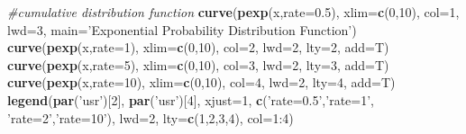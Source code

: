\documentclass[]{article}
\newenvironment{Shaded}{\begin{snugshade}}{\end{snugshade}}
\newcommand{\KeywordTok}[1]{\textcolor[rgb]{0.13,0.29,0.53}{\textbf{{#1}}}}
\newcommand{\DataTypeTok}[1]{\textcolor[rgb]{0.13,0.29,0.53}{{#1}}}
\newcommand{\DecValTok}[1]{\textcolor[rgb]{0.00,0.00,0.81}{{#1}}}
\newcommand{\FloatTok}[1]{\textcolor[rgb]{0.00,0.00,0.81}{{#1}}}
\newcommand{\StringTok}[1]{\textcolor[rgb]{0.31,0.60,0.02}{{#1}}}
\newcommand{\CommentTok}[1]{\textcolor[rgb]{0.56,0.35,0.01}{\textit{{#1}}}}
\newcommand{\NormalTok}[1]{{#1}}
\begin{document}
\begin{Shaded}
\begin{Highlighting}[]
\CommentTok{#cumulative distribution function}
\KeywordTok{curve}\NormalTok{(}\KeywordTok{pexp}\NormalTok{(x,}\DataTypeTok{rate=}\FloatTok{0.5}\NormalTok{), }\DataTypeTok{xlim=}\KeywordTok{c}\NormalTok{(}\DecValTok{0}\NormalTok{,}\DecValTok{10}\NormalTok{), }\DataTypeTok{col=}\DecValTok{1}\NormalTok{, }\DataTypeTok{lwd=}\DecValTok{3}\NormalTok{,}
      \DataTypeTok{main=}\StringTok{'Exponential Probability Distribution Function'}\NormalTok{)}
\KeywordTok{curve}\NormalTok{(}\KeywordTok{pexp}\NormalTok{(x,}\DataTypeTok{rate=}\DecValTok{1}\NormalTok{), }\DataTypeTok{xlim=}\KeywordTok{c}\NormalTok{(}\DecValTok{0}\NormalTok{,}\DecValTok{10}\NormalTok{), }\DataTypeTok{col=}\DecValTok{2}\NormalTok{, }\DataTypeTok{lwd=}\DecValTok{2}\NormalTok{, }\DataTypeTok{lty=}\DecValTok{2}\NormalTok{,}
      \DataTypeTok{add=}\NormalTok{T)}
\KeywordTok{curve}\NormalTok{(}\KeywordTok{pexp}\NormalTok{(x,}\DataTypeTok{rate=}\DecValTok{5}\NormalTok{), }\DataTypeTok{xlim=}\KeywordTok{c}\NormalTok{(}\DecValTok{0}\NormalTok{,}\DecValTok{10}\NormalTok{), }\DataTypeTok{col=}\DecValTok{3}\NormalTok{, }\DataTypeTok{lwd=}\DecValTok{2}\NormalTok{, }\DataTypeTok{lty=}\DecValTok{3}\NormalTok{,}
      \DataTypeTok{add=}\NormalTok{T)}
\KeywordTok{curve}\NormalTok{(}\KeywordTok{pexp}\NormalTok{(x,}\DataTypeTok{rate=}\DecValTok{10}\NormalTok{), }\DataTypeTok{xlim=}\KeywordTok{c}\NormalTok{(}\DecValTok{0}\NormalTok{,}\DecValTok{10}\NormalTok{), }\DataTypeTok{col=}\DecValTok{4}\NormalTok{, }\DataTypeTok{lwd=}\DecValTok{2}\NormalTok{, }\DataTypeTok{lty=}\DecValTok{4}\NormalTok{,}
      \DataTypeTok{add=}\NormalTok{T)}
\KeywordTok{legend}\NormalTok{(}\KeywordTok{par}\NormalTok{(}\StringTok{'usr'}\NormalTok{)[}\DecValTok{2}\NormalTok{], }\KeywordTok{par}\NormalTok{(}\StringTok{'usr'}\NormalTok{)[}\DecValTok{4}\NormalTok{], }\DataTypeTok{xjust=}\DecValTok{1}\NormalTok{,}
       \KeywordTok{c}\NormalTok{(}\StringTok{'rate=0.5'}\NormalTok{,}\StringTok{'rate=1'}\NormalTok{, }\StringTok{'rate=2'}\NormalTok{,}\StringTok{'rate=10'}\NormalTok{),}
       \DataTypeTok{lwd=}\DecValTok{2}\NormalTok{, }\DataTypeTok{lty=}\KeywordTok{c}\NormalTok{(}\DecValTok{1}\NormalTok{,}\DecValTok{2}\NormalTok{,}\DecValTok{3}\NormalTok{,}\DecValTok{4}\NormalTok{),}
       \DataTypeTok{col=}\DecValTok{1}\NormalTok{:}\DecValTok{4}\NormalTok{)}
\end{Highlighting}
\end{Shaded}
\end{document}
